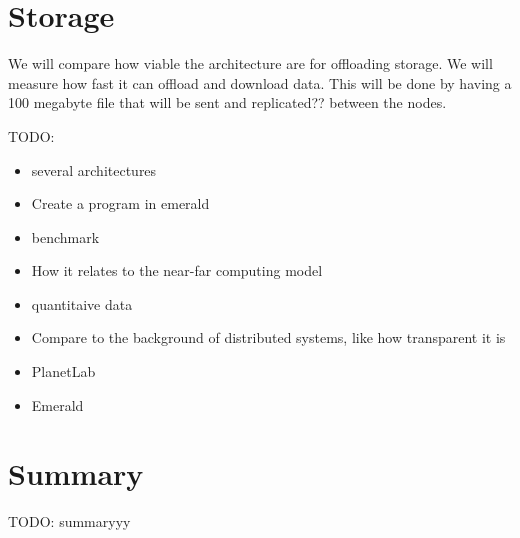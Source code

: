 \section{Storage}
We will compare how viable the architecture are for offloading storage. We will measure how fast it can offload and download data. This will be done by having a 100 megabyte file that will be sent and replicated?? between the nodes.



\bigskip
TODO:
\begin{itemize}
    \item several architectures  
    \item Create a program in emerald  
    \item benchmark  
    \item How it relates to the near-far computing model  
    \item quantitaive data  
    \item Compare to the background of distributed systems, like how transparent it is  
    \item PlanetLab  
    \item Emerald  
\end{itemize}




\section{Summary}
TODO: summaryyy



